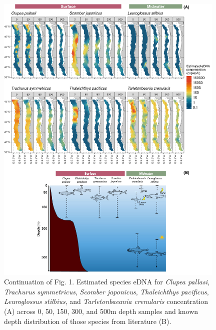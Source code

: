 \documentclass[9pt,twoside,lineno]{pnas-SI}
\begin{document}
\begin{figure}
\centering
\includegraphics[width=0.98\textwidth]{plots/5_Supplementary_Figure_1.jpg}
\caption{Continuation of Fig. 1. Estimated species eDNA for \textit{Clupea pallasi}, \textit{Trachurus symmetricus}, \textit{Scomber japonicus}, \textit{Thaleichthys pacificus}, \textit{Leuroglossus stilbius}, and \textit{Tarletonbaeania crenularis} concentration (A) across 0, 50, 150, 300, and 500m depth samples and known depth distribution of those species from literature (B).}
\end{figure}
\end{document}
